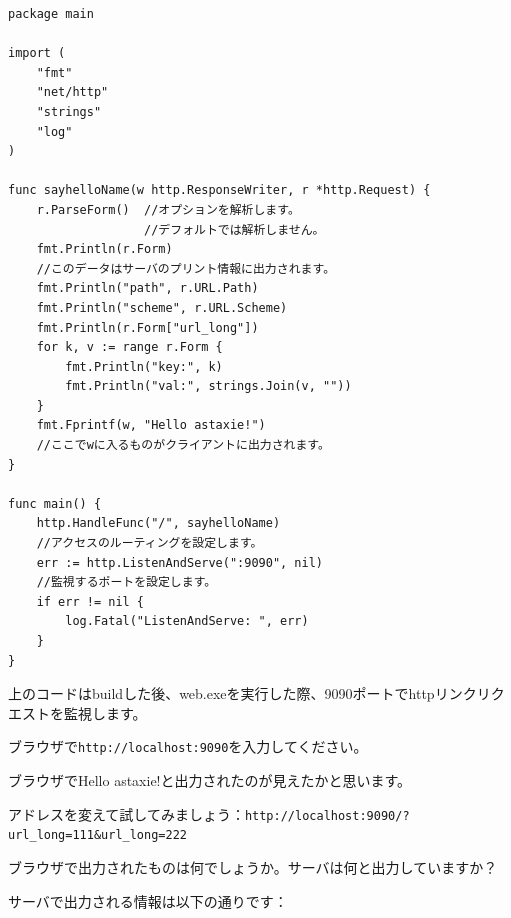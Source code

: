 \begin{lstlisting}[numbers=none]
package main

import (
    "fmt"
    "net/http"
    "strings"
    "log"
)

func sayhelloName(w http.ResponseWriter, r *http.Request) {
    r.ParseForm()  //オプションを解析します。
                   //デフォルトでは解析しません。
    fmt.Println(r.Form)
    //このデータはサーバのプリント情報に出力されます。
    fmt.Println("path", r.URL.Path)
    fmt.Println("scheme", r.URL.Scheme)
    fmt.Println(r.Form["url_long"])
    for k, v := range r.Form {
        fmt.Println("key:", k)
        fmt.Println("val:", strings.Join(v, ""))
    }
    fmt.Fprintf(w, "Hello astaxie!")
    //ここでwに入るものがクライアントに出力されます。
}

func main() {
    http.HandleFunc("/", sayhelloName)
    //アクセスのルーティングを設定します。
    err := http.ListenAndServe(":9090", nil)
    //監視するポートを設定します。
    if err != nil {
        log.Fatal("ListenAndServe: ", err)
    }
}
\end{lstlisting}

上のコードはbuildした後、web.exeを実行した際、9090ポートでhttpリンクリクエストを監視します。

ブラウザで\texttt{http:\/\//\/\//localhost:9090}を入力してください。

ブラウザでHello astaxie!と出力されたのが見えたかと思います。

アドレスを変えて試してみましょう：\texttt{http:\//\//localhost:9090\//?url\_long=111\&url\_long=222}

ブラウザで出力されたものは何でしょうか。サーバは何と出力していますか？

サーバで出力される情報は以下の通りです：

